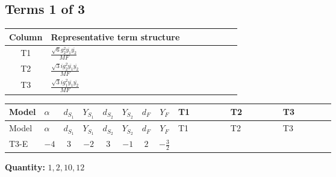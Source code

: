 \documentclass[8pt]{article}
\begin{document}
\begin{landscape}
\subsection*{Terms 1 of 3}
\begin{center}
\begin{tabular}{@{}c >{\raggedright\arraybackslash}p{0.82\linewidth}@{}}
\toprule
Column & Representative term structure \\
\midrule
T1 & \(\displaystyle \frac{\sqrt{6} g_{2}^{2} \overline{y_{1}} \overline{y_{2}}}{MF}\) \\
\midrule
T2 & \(\displaystyle \frac{\sqrt{3} i g_{2}^{2} \overline{y_{1}} \overline{y_{2}}}{MF}\) \\
\midrule
T3 & \(\displaystyle \frac{\sqrt{3} i g_{1}^{2} \overline{y_{1}} \overline{y_{2}}}{MF}\) \\
\midrule
\bottomrule
\end{tabular}
\end{center}
\smallskip
\tiny
\begin{longtable}{@{}llcccccc >{\raggedright\arraybackslash}p{0.21\linewidth} >{\raggedright\arraybackslash}p{0.21\linewidth} >{\raggedright\arraybackslash}p{0.21\linewidth}@{}}
\toprule
Model & $\alpha$ & $d_{S_1}$ & $Y_{S_1}$ & $d_{S_2}$ & $Y_{S_2}$ & $d_F$ & $Y_F$ & T1 & T2 & T3 \\
\midrule
\endfirsthead
\toprule
Model & $\alpha$ & $d_{S_1}$ & $Y_{S_1}$ & $d_{S_2}$ & $Y_{S_2}$ & $d_F$ & $Y_F$ & T1 & T2 & T3 \\
\midrule
\endhead
T3-E & $-4$ & $3$ & $-2$ & $3$ & $-1$ & $2$ & $-\frac{3}{2}$ & \scriptsize\adjustbox{max width=\linewidth}{$\begin{gathered} - \frac{\sqrt{6} g_{2}^{2} \overline{y_{1}} \overline{y_{2}}}{6 MF}\end{gathered}$} & \scriptsize\adjustbox{max width=\linewidth}{$\begin{gathered} - \frac{15 \sqrt{3} i g_{2}^{2} \overline{y_{1}} \overline{y_{2}}}{8 MF}\end{gathered}$} & \scriptsize\adjustbox{max width=\linewidth}{$\begin{gathered} - \frac{9 \sqrt{3} i g_{1}^{2} \overline{y_{1}} \overline{y_{2}}}{8 MF}\end{gathered}$} \\
\midrule
\bottomrule
\end{longtable}
\clearpage
\noindent\textbf{Quantity: }$\mathrm{1,2,10,12}$\par\smallskip

\end{landscape}
\end{document}
